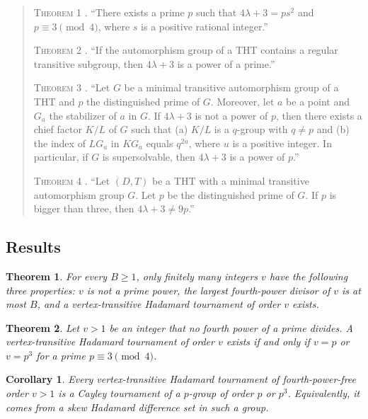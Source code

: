 \documentclass[11pt]{amsart}
\newtheorem{mainthm}{Theorem}
\newtheorem{corollary}[theorem]{Corollary}
\theoremstyle{definition}
\theoremstyle{remark}
\begin{document}
\begin{quote}
\textsc{Theorem 1} \cite[p.~39]{Ito84}. ``There exists a prime $p$ such that $4\lambda+3=ps^2$ and $p\equiv3\pmod 4$, where $s$ is a positive rational integer.''

\textsc{Theorem 2} \cite[p.~40]{Ito84}. ``If the automorphism group of a THT contains a regular transitive subgroup, then $4\lambda+3$ is a power of a prime.''

\textsc{Theorem 3} \cite[p.~41]{Ito84}. ``Let $G$ be a minimal transitive automorphism group of a THT and $p$ the distinguished prime of $G$. Moreover, let $a$ be a point and $G_a$ the stabilizer of $a$ in $G$. If $4\lambda+3$ is not a power of $p$, then there exists a chief factor $K/L$ of $G$ such that (a) $K/L$ is a $q$-group with $q\ne p$ and (b) the index of $LG_a$ in $KG_a$ equals $q^{2u}$, where $u$ is a positive integer. In particular, if $G$ is supersolvable, then $4\lambda+3$ is a power of $p$.''

\textsc{Theorem 4} \cite[p.~41]{Ito84}. ``Let $(D,T)$ be a THT with a minimal transitive automorphism group $G$. Let $p$ be the distinguished prime of $G$. If $p$ is bigger than three, then $4\lambda+3\ne9p$.''
\end{quote}

\subsection*{Results}
\begin{mainthm}\label{thm:A}
For every $B\ge1$, only finitely many integers $v$ have the following three properties: $v$ is not a prime power, the largest fourth-power divisor of $v$ is at most $B$, and a vertex-transitive Hadamard tournament of order $v$ exists.
\end{mainthm}

\begin{mainthm}\label{thm:fourthfree}
Let $v>1$ be an integer that no fourth power of a prime divides. A vertex-transitive Hadamard tournament of order $v$ exists if and only if $v=p$ or $v=p^3$ for a prime $p\equiv3\pmod4$.
\end{mainthm}

\begin{corollary}\label{cor:cayley}
Every vertex-transitive Hadamard tournament of fourth-power-free order $v>1$ is a Cayley tournament of a $p$-group of order $p$ or $p^3$. Equivalently, it comes from a skew Hadamard difference set in such a group.
\end{corollary}
\end{document}

